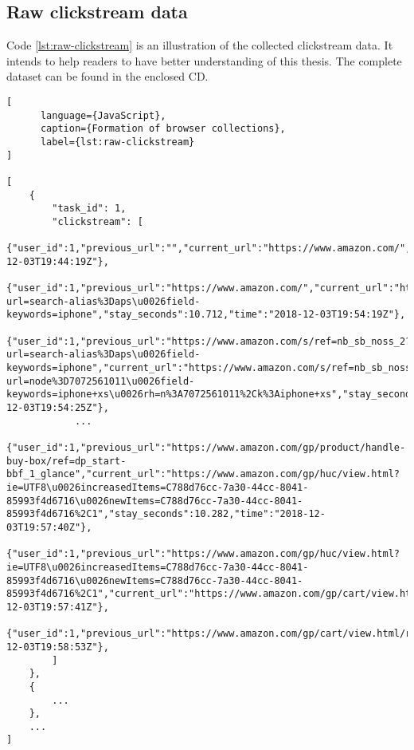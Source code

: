 \subsection{Raw clickstream data}

Code \ref{lst:raw-clickstream} is an illustration of the collected clickstream data.
It intends to help readers to have better understanding of this thesis.
The complete dataset can be found in the enclosed CD.

\begin{lstlisting}[
      language={JavaScript},
      caption={Formation of browser collections},
      label={lst:raw-clickstream}
]

[
    {
        "task_id": 1,
        "clickstream": [
            {"user_id":1,"previous_url":"","current_url":"https://www.amazon.com/","stay_seconds":26.214,"time":"2018-12-03T19:44:19Z"},
            {"user_id":1,"previous_url":"https://www.amazon.com/","current_url":"https://www.amazon.com/s/ref=nb_sb_noss_2?url=search-alias%3Daps\u0026field-keywords=iphone","stay_seconds":10.712,"time":"2018-12-03T19:54:19Z"},
            {"user_id":1,"previous_url":"https://www.amazon.com/s/ref=nb_sb_noss_2?url=search-alias%3Daps\u0026field-keywords=iphone","current_url":"https://www.amazon.com/s/ref=nb_sb_noss?url=node%3D7072561011\u0026field-keywords=iphone+xs\u0026rh=n%3A7072561011%2Ck%3Aiphone+xs","stay_seconds":6.099,"time":"2018-12-03T19:54:25Z"},
            ...
            {"user_id":1,"previous_url":"https://www.amazon.com/gp/product/handle-buy-box/ref=dp_start-bbf_1_glance","current_url":"https://www.amazon.com/gp/huc/view.html?ie=UTF8\u0026increasedItems=C788d76cc-7a30-44cc-8041-85993f4d6716\u0026newItems=C788d76cc-7a30-44cc-8041-85993f4d6716%2C1","stay_seconds":10.282,"time":"2018-12-03T19:57:40Z"},
            {"user_id":1,"previous_url":"https://www.amazon.com/gp/huc/view.html?ie=UTF8\u0026increasedItems=C788d76cc-7a30-44cc-8041-85993f4d6716\u0026newItems=C788d76cc-7a30-44cc-8041-85993f4d6716%2C1","current_url":"https://www.amazon.com/gp/cart/view.html/ref=lh_cart_vc_btn","stay_seconds":1.886,"time":"2018-12-03T19:57:41Z"},
            {"user_id":1,"previous_url":"https://www.amazon.com/gp/cart/view.html/ref=lh_cart_vc_btn","current_url":"https://www.amazon.com/ap/signin","stay_seconds":71.552,"time":"2018-12-03T19:58:53Z"},
        ]
    },
    {
        ...
    },
    ...
]

\end{lstlisting}


\cleardoublepage
